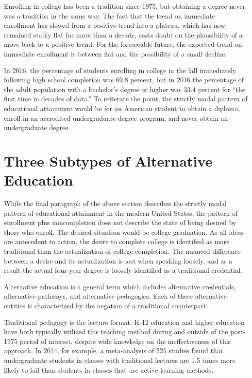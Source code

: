 \documentclass[AER]{/Users/zyl357/Documents/GitHub/research-dissertation-case-for-alt-ed/papers/alt-ed-survey/aea-latex-templates/AEA}
\begin{document}
Enrolling in college has been a tradition since 1975, but obtaining a
degree never was a tradition in the same way. The fact that the trend on
immediate enrollment has slowed from a positive trend into a plateau,
which has now remained stably flat for more than a decade, casts doubt on
the plausibility of a move back to a positive trend. For the foreseeable
future, the expected trend on immediate enrollment is between flat and the
possibility of a small decline.

In 2016, the percentage of students enrolling in college in the fall
immediately following high school completion was 69.8 percent\cite{nces_2019}, but in 2016 the
percentage of the adult population with a bachelor’s degree or higher was
33.4 percent\cite{censusbureau_2017} for “the first time in decades of data.” To reiterate the point, the
strictly modal pattern of educational attainment would be for an American
student to obtain a diploma, enroll in an accredited undergraduate degree
program, and never obtain an undergraduate degree.

\section{Three Subtypes of Alternative Education}

While the final paragraph of the above section describes the strictly
modal pattern of educational attainment in the modern United States, the
pattern of enrollment plus noncompletion does not describe the state of
being desired by those who enroll. The desired situation would be college
graduation. As all ideas are antecedent to action, the desire to complete
college is identified as more traditional than the actualization of
college completion. The nuanced difference between a desire and its
actualization is lost when speaking loosely, and as a result the actual
four-year degree is loosely identified as a traditional credential.

Alternative education is a general term which includes alternative
credentials, alternative pathways, and alternative pedagogies. Each of
these alternative entities is characterized by the negation of a
traditional counterpart.

Traditional pedagogy is the lecture format. K-12 education and higher
education have both typically utilized this teaching method during and
outside of the post-1975 period of interest, despite wide knowledge on the
ineffectiveness of this approach. In 2014, for example, a meta-analysis of
225 studies found that undergraduate students in classes with traditional
lectures are 1.5 times more likely to fail than students in classes that
use active learning methods\cite{freeman2014active}.
\end{document}
